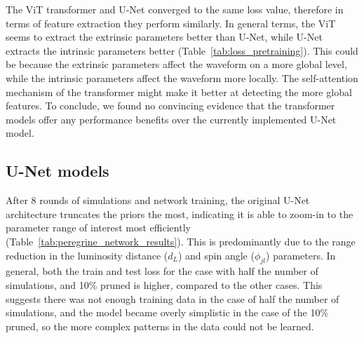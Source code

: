
The ViT transformer and U-Net converged to the same loss value, therefore in terms of feature extraction they perform similarly. In general terms, the ViT seems to extract the extrinsic parameters better than U-Net, while U-Net extracts the intrinsic parameters better (Table~\ref{tab:loss_pretraining}). This could be because the extrinsic parameters affect the waveform on a more global level, while the intrinsic parameters affect the waveform more locally. The self-attention mechanism of the transformer might make it better at detecting the more global features. To conclude, we found no convincing evidence that the transformer models offer any performance benefits over the currently implemented U-Net model.

\subsection{U-Net models}

After 8 rounds of simulations and network training, the original U-Net architecture truncates the priors the most, indicating it is able to zoom-in to the parameter range of interest most efficiently (Table~\ref{tab:peregrine_network_results}). This is predominantly due to the range reduction in the luminosity distance ($d_L$) and spin angle ($\phi_{jl}$) parameters. In general, both the train and test loss for the case with half the number of simulations, and 10\% pruned is higher, compared to the other cases. This suggests there was not enough training data in the case of half the number of simulations, and the model became overly simplistic in the case of the 10\% pruned, so the more complex patterns in the data could not be learned.



